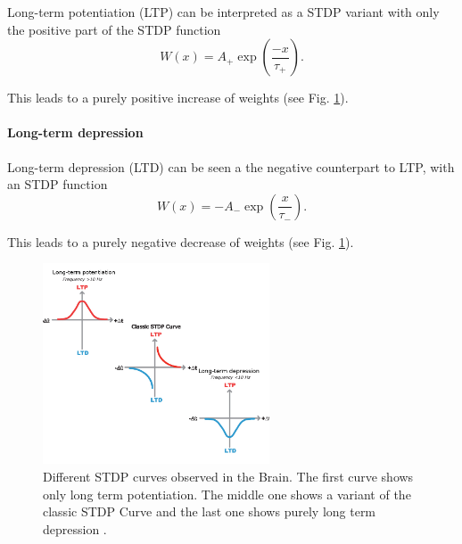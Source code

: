 Long-term potentiation (LTP) can be interpreted as a STDP variant with only the positive part of the STDP function
\[
W(x) =  A_+ \exp(\frac{-x}{\tau_+}).
\]

This leads to a purely positive increase of weights (see Fig. \ref{fig:stdp}).

\paragraph{Long-term depression} \label{c:ldp}

Long-term depression (LTD) can be seen a the negative counterpart to LTP, with an STDP function
\[
W(x) =  -A_- \exp(\frac{x}{\tau_-}).
\]

This leads to a purely negative decrease of weights (see Fig. \ref{fig:stdp}).

\begin{figure}
	\centering
    	\includegraphics[width=0.6\textwidth]{imgs/stdp_curves.jpg} 
    \caption{Different STDP curves observed in the Brain. The first curve shows only long term potentiation. The middle one shows a variant of the classic STDP Curve and the last one shows purely long term depression \cite{Buchanan2010}.}
	\label{fig:stdp}
\end{figure}